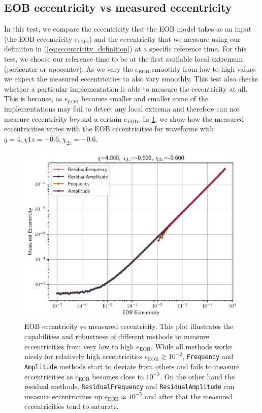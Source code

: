 \documentclass[aps,prd,amsmath,floats,floatfix, twocolumn,
superscriptaddress,nofootinbib,showpacs]{revtex4-1}
\begin{document}
\subsection{EOB eccentricity vs measured eccentricity}
\label{sec:eob-eccentricity-vs-measured-eccentricity}
In this test, we compare the eccentricity that the EOB model takes as an input (the EOB eccentricity $e_{\text{EOB}}$) and the eccentricity that we measure using
our definition in (\ref{eq:eccentricity_definition}) at a specific reference time. For this test, we choose our reference time to be at the first available local
extremum (pericenter or apocenter). As we vary the $e_{\text{EOB}}$ smoothly from low to high values we expect the measured eccentricities to also vary smoothly.
This test also checks whether a particular implementation is able to measure the eccentricity at all. This is because, as $e_{\text{EOB}}$ becomes smaller and smaller
some of the implementations may fail to detect any local extrema and therefore can not measure eccentricity beyond a certain $e_{\text{EOB}}$. In \ref{fig:eob_vs_measured_ecc},
we show how the measured eccentricities varies with the EOB eccentricities for waveforms with $q=4, \chi{1z}=-0.6, \chi_{2z}=-0.6$.


\begin{figure}[thb]
\includegraphics[width=\columnwidth]{test_eob_vs_measured_ecc_example}
\caption{EOB eccentricity vs measured eccentricity. This plot illustrates the capabilities and robustness of different methods to measure eccentricities from very low to high $e_{\text{EOB}}$.
  While all methods works nicely for relatively high eccentricities $e_{\text{EOB}} \gtrsim 10^{-2}$, \texttt{Frequency} and \texttt{Amplitude} methods start to deviate from others
  and fails to measure eccentricities as $e_{\text{EOB}}$ becomes close to $10^{-3}$. On the other hand the residual methods, \texttt{ResidualFrequency} and \texttt{ResidualAmplitude}
can measure eccentricities up $e_{\text{EOB}} \simeq 10^{-5}$ and after that the measured eccentricities tend to saturate.}
\label{fig:eob_vs_measured_ecc}
\end{figure}
\end{document}
